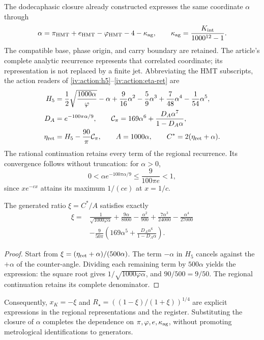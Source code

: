 The dodecaphasic closure already constructed expresses the same coordinate \(\alpha\) through
\[
 \alpha=\pi_{\mathrm{HMT}}+e_{\mathrm{HMT}}-\varphi_{\mathrm{HMT}}-4-\kappa_{\rm ag},
 \qquad \kappa_{\rm ag}=\frac{K_{\rm int}}{1000^{12}-1}.
\]
The compatible base, phase origin, and carry boundary are retained. The article's complete analytic recurrence represents that correlated coordinate; its representation is not replaced by a finite jet. Abbreviating the HMT subscripts, the action readers of \eqref{iv:action:h5}--\eqref{iv:action:eta-ret} are
\begin{align}
 H_5&=\frac12\sqrt{\frac{1000\alpha}{\varphi}}-\alpha
       +\frac9{16}\alpha^2-\frac59\alpha^3
       +\frac7{48}\alpha^4-\frac1{54}\alpha^5,\nonumber\\
 D_A&=e^{-100\pi\alpha/9},\qquad
 \mathcal C_\pi=169\alpha^6+\frac{D_A\alpha^7}{1-D_A\alpha},\nonumber\\
 \eta_{\rm ret}&=H_5-\frac{90}{\pi}\mathcal C_\pi,
 \qquad A=1000\alpha,\qquad C^*=2(\eta_{\rm ret}+\alpha).
 \label{rec:eq:lectores-completos}
\end{align}
The rational continuation retains every term of the regional recurrence. Its convergence follows without truncation: for \(\alpha>0\),
\[
 0<\alpha e^{-100\pi\alpha/9}\le\frac9{100\pi e}<1,
\]
since \(xe^{-cx}\) attains its maximum \(1/(ce)\) at \(x=1/c\).

\begin{proposition}
\label{rec:prop:sustitucion}
The generated ratio \(\xi=C^*/A\) satisfies exactly
\begin{align}
 \xi={}&\frac1{\sqrt{1000\varphi\alpha}}
 +\frac{9\alpha}{8000}-\frac{\alpha^2}{900}
 +\frac{7\alpha^3}{24000}-\frac{\alpha^4}{27000}\nonumber\\
 &-\frac9{50\pi}
 \left(169\alpha^5+\frac{D_A\alpha^6}{1-D_A\alpha}\right).
 \label{rec:eq:xi-completa}
\end{align}
\end{proposition}
\begin{proof}
Start from \(\xi=(\eta_{\rm ret}+\alpha)/(500\alpha)\). The term \(-\alpha\) in \(H_5\) cancels against the \(+\alpha\) of the counter-angle. Dividing each remaining term by \(500\alpha\) yields the expression: the square root gives \(1/\sqrt{1000\varphi\alpha}\), and \(90/500=9/50\). The regional continuation retains its complete denominator.
\end{proof}

Consequently, \(x_K=-\xi\) and \(R_\star=((1-\xi)/(1+\xi))^{1/4}\) are explicit expressions in the regional representations and the register. Substituting the closure of \(\alpha\) completes the dependence on \(\pi,\varphi,e,\kappa_{\rm ag}\), without promoting metrological identifications to generators.

